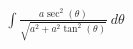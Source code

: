 \documentclass[preview]{standalone}
\begin{document}
\begin{align*}
\int \frac{a\sec^2(\theta)}{\sqrt{a^2+a^2 \tan^2(\theta)}} \ d\theta
\end{align*}
\end{document}
